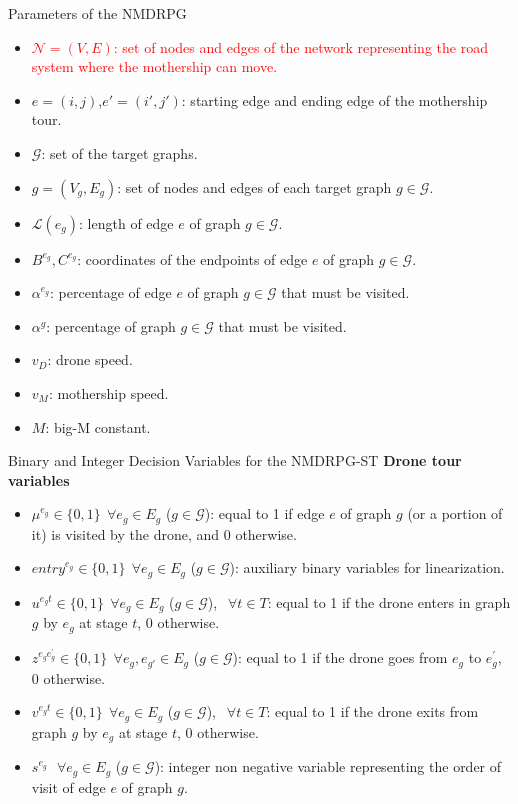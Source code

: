 \documentclass[slidestop,usepdftitle=false,10pt]{beamer}
\begin{document}
	\begin{frame}{Parameters of the NMDRPG}
		\begin{itemize}
        \item \textcolor{red}{$\mathcal N=(V, E)$: set of nodes and edges of the network representing the road system where the mothership can move.}
        \item $e=(i,j)$,$e'=(i',j')$: starting edge and ending edge of the mothership tour.
        \item $\mathcal{G}$: set of the target graphs.
        \item $g = (V_g, E_g)$: set of nodes and edges of each target graph $g \in \mathcal{G}$.
        \item $\mathcal{L}(e_g)$: length of edge $e$ of graph $g \in \mathcal{G}$.
        \item $B^{e_g}, C^{e_g}$: coordinates of the endpoints of edge $e$ of graph $g \in \mathcal{G}$.
        \item $\alpha^{e_g}$: percentage of edge $e$ of graph $g \in \mathcal{G}$ that must be visited.
        \item $\alpha^g$: percentage of graph $g \in \mathcal{G}$ that must be visited.
        \item $v_D$: drone speed.
        \item $v_M$: mothership speed.
        \item $M$: big-M constant.
    \end{itemize}
	    
	    
	\end{frame}
	
	\begin{frame}{Binary and Integer Decision Variables for the NMDRPG-ST}
	\textbf{Drone tour variables}
	\begin{itemize}
	    \item $\mu^{e_g} \in \{0,1\} \:\: \forall e_g \in E_g$ ($g \in \mathcal{G}$): equal to 1 if edge $e$ of graph $g$ (or a portion of it) is visited by the drone,  and 0 otherwise.
        \item $entry^{e_g} \in \{0,1\} \:\: \forall e_g \in E_g$ ($g \in \mathcal{G}$): auxiliary binary variables for linearization.
        \item $u^{e_{g}t} \in \{0,1\} \:\: \forall e_g \in E_g$ ($g \in \mathcal{G}$), $\:\: \forall t \in T$: equal to 1 if the drone enters in graph $g$ by $e_g$ at stage $t$,   0 otherwise.
        \item $z^{e_{g}e^{'}_{g}} \in \{0,1\} \:\: \forall e_g, e_{g'} \in E_g$ ($g \in \mathcal{G}$): equal to 1 if the drone goes from $e_g$ to $e^{'}_{g}$, 0 otherwise.
        \item $v^{e_{g}t} \in \{0,1\} \:\: \forall e_g \in E_g$ ($g \in \mathcal{G}$), $\:\: \forall t \in T$: equal to 1 if the drone exits from graph $g$ by $e_g$ at stage $t$,  0 otherwise.
        \item $s^{e_g} \:\:\ \forall e_g \in E_g$ ($g \in \mathcal{G}$): integer non negative variable representing the order of visit of edge $e$ of graph $g$.
    \end{itemize}
    \end{frame}
    
\end{document}
